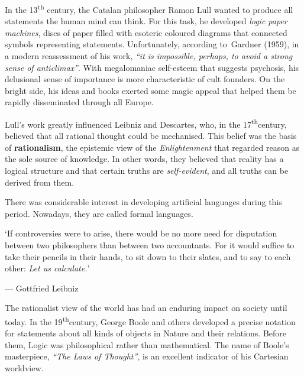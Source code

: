 \documentclass[
  letterpaper,
  12pt,
  british]{tufte-book}
\renewenvironment{quote}{
  \list{}{\leftmargin=3.5cm\topsep=0pt}
  \item\relax\small\itshape
}
{\endlist}
\theoremstyle{plain}
\theoremstyle{plain}
\theoremstyle{definition}
\theoremstyle{remark}
\begin{document}
In the 13\textsuperscript{th} century, the Catalan philosopher Ramon
Lull wanted to produce all statements the human mind can think. For this
task, he developed \emph{logic paper machines}, discs of paper filled
with esoteric coloured diagrams that connected symbols representing
statements. Unfortunately, according to~Gardner
(1959),
in a modern reassessment of his work, \emph{``it is impossible, perhaps,
to avoid a strong sense of anticlimax''}. With megalomaniac self-esteem
that suggests psychosis, his delusional sense of importance is more
characteristic of cult founders. On the bright side, his ideas and books
exerted some magic appeal that helped them be rapidly disseminated
through all Europe.

Lull's work greatly influenced Leibniz and Descartes, who, in the
17\textsuperscript{th}century, believed that all rational thought could
be mechanised. This belief was the basis of \textbf{rationalism}, the
epistemic view of the \emph{Enlightenment} that regarded reason as the
sole source of knowledge. In other words, they believed that reality has
a logical structure and that certain truths are \emph{self-evident}, and
all truths can be derived from them.

There was considerable interest in developing artificial languages
during this period. Nowadays, they are called formal languages.

\begin{quote}
`If controversies were to arise, there would be no more need for
disputation between two philosophers than between two accountants. For
it would suffice to take their pencils in their hands, to sit down to
their slates, and to say to each other: \emph{Let us calculate.}'

--- Gottfried Leibniz
\end{quote}

The rationalist view of the world has had an enduring impact on society
until today. In the 19\textsuperscript{th}century, George Boole and
others developed a precise notation for statements about all kinds of
objects in Nature and their relations. Before them, Logic was
philosophical rather than mathematical. The name of Boole's masterpiece,
\emph{``The Laws of Thought''}, is an excellent indicator of his
Cartesian worldview.
\end{document}
